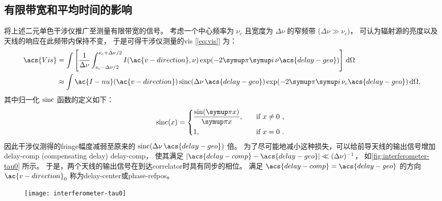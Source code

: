 \subsection{有限带宽和平均时间的影响}

将上述二元单色干涉仪推广至测量有限带宽的信号。
考虑一个中心频率为 $\nu_c$ 且宽度为 $\Delta\nu$ 的窄频带 ($\Delta\nu \gg \nu_c$)，
可认为辐射源的亮度以及天线的响应在此频带内保持不变，
于是可得干涉仪测量的\ac{vis} [\autoref{eq:vis}] 为：
\begin{align}
  \acs{Vis}
    & = \int \left[ \frac{1}{\Delta\nu}
        \int_{\nu_c-\Delta\nu/2}^{\nu_c+\Delta\nu/2}
        I(\ac{v-direction}, \nu) \exp (-2\Cpi\Ci\, \nu\acs{delay-geo})
      \right] \,\D{\Omega} \\
    & \approx \int \ac{I-nu}(\ac{v-direction})
      \sinc (\Delta\nu\,\acs{delay-geo})
      \exp (-2\Cpi\Ci\, \nu_c\acs{delay-geo}) \,\D{\Omega},
  \label{eq:vis-bw}
\end{align}
其中归一化 $\operatorname{sinc}$ 函数的定义如下：
\begin{equation}
  \label{eq:sinc}
  \sinc(x) =
    \begin{dcases*}
      \frac{\sin(\Cpi x)}{\Cpi x}, \quad & if $x \neq 0$ , \\
      1, \quad & if $x = 0$ .
    \end{dcases*}
\end{equation}
因此干涉仪测得的\ac{fringe}幅度减弱至原来的
$\sinc(\Delta\nu\,\acs{delay-geo})$ 倍。
为了尽可能地减小这种损失，可以给前导天线的输出信号增加\acl{delay-comp}
(compensating delay) \ac{delay-comp}，
使其满足 $|\acs{delay-comp} - \acs{delay-geo}| \ll (\Delta\nu)^{-1}$，
如\autoref{fig:interferometer-tau0} 所示。
于是，两个天线的输出信号在到达\ac{correlator}时具有同步的相位。
满足 $\acs{delay-comp} = \acs{delay-geo}$ 的方向 $\ac{v-direction}_0$
称为\acf{delay-center}或\acf{phase-refpos}。

\begin{figure}[htp]
  \centering
  \texttt{[image: interferometer-tau0]}
  \label{fig:interferometer-tau0}
\end{figure}

